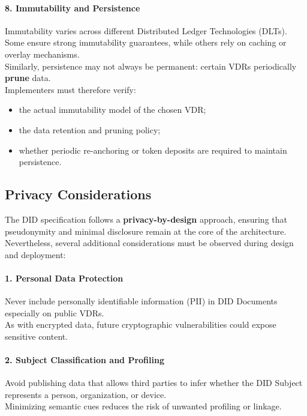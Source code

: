 \paragraph{8. Immutability and Persistence}
Immutability varies across different Distributed Ledger Technologies (DLTs).\\
Some ensure strong immutability guarantees, while others rely on caching or overlay mechanisms.\\
Similarly, persistence may not always be permanent: certain VDRs periodically \textbf{prune} data.\\
Implementers must therefore verify:
\begin{itemize}
    \item the actual immutability model of the chosen VDR;
    \item the data retention and pruning policy;
    \item whether periodic re-anchoring or token deposits are required to maintain persistence.
\end{itemize}

\subsection{Privacy Considerations}

The DID specification follows a \textbf{privacy-by-design} approach, ensuring that pseudonymity and minimal disclosure remain at the core of the architecture.\\
Nevertheless, several additional considerations must be observed during design and deployment:

\paragraph{1. Personal Data Protection}
Never include personally identifiable information (PII) in DID Documents especially on public VDRs.\\  
As with encrypted data, future cryptographic vulnerabilities could expose sensitive content.

\paragraph{2. Subject Classification and Profiling}
Avoid publishing data that allows third parties to infer whether the DID Subject represents a person, organization, or device.\\ 
Minimizing semantic cues reduces the risk of unwanted profiling or linkage.

